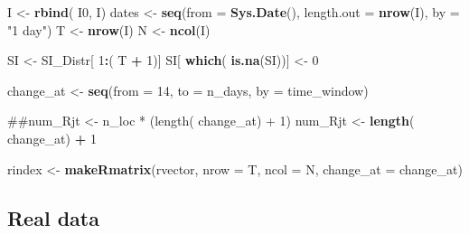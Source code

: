 \documentclass[11pt,]{article}
\newenvironment{Shaded}{\begin{snugshade}}{\end{snugshade}}
\newcommand{\KeywordTok}[1]{\textcolor[rgb]{0.13,0.29,0.53}{\textbf{#1}}}
\newcommand{\DataTypeTok}[1]{\textcolor[rgb]{0.13,0.29,0.53}{#1}}
\newcommand{\DecValTok}[1]{\textcolor[rgb]{0.00,0.00,0.81}{#1}}
\newcommand{\StringTok}[1]{\textcolor[rgb]{0.31,0.60,0.02}{#1}}
\newcommand{\OperatorTok}[1]{\textcolor[rgb]{0.81,0.36,0.00}{\textbf{#1}}}
\newcommand{\NormalTok}[1]{#1}
\begin{document}
\begin{Shaded}
\begin{Highlighting}[]
\NormalTok{I     <-}\StringTok{ }\KeywordTok{rbind}\NormalTok{( I0, I)}
\NormalTok{dates <-}\StringTok{ }\KeywordTok{seq}\NormalTok{(}\DataTypeTok{from =} \KeywordTok{Sys.Date}\NormalTok{(),}
             \DataTypeTok{length.out =} \KeywordTok{nrow}\NormalTok{(I),}
             \DataTypeTok{by =} \StringTok{"1 day"}\NormalTok{)}
\NormalTok{T  <-}\StringTok{ }\KeywordTok{nrow}\NormalTok{(I)}
\NormalTok{N  <-}\StringTok{ }\KeywordTok{ncol}\NormalTok{(I)}

\NormalTok{SI <-}\StringTok{ }\NormalTok{SI_Distr[ }\DecValTok{1}\OperatorTok{:}\NormalTok{( T }\OperatorTok{+}\StringTok{ }\DecValTok{1}\NormalTok{)]}
\NormalTok{SI[ }\KeywordTok{which}\NormalTok{( }\KeywordTok{is.na}\NormalTok{(SI))] <-}\StringTok{ }\DecValTok{0}

\NormalTok{change_at <-}\StringTok{ }\KeywordTok{seq}\NormalTok{(}\DataTypeTok{from =} \DecValTok{14}\NormalTok{, }\DataTypeTok{to =}\NormalTok{ n_days, }\DataTypeTok{by =}\NormalTok{ time_window)}

\NormalTok{##num_Rjt   <-  n_loc * (length( change_at) + 1)}
\NormalTok{num_Rjt <-}\StringTok{ }\KeywordTok{length}\NormalTok{( change_at) }\OperatorTok{+}\StringTok{ }\DecValTok{1}

\NormalTok{rindex  <-}\StringTok{ }\KeywordTok{makeRmatrix}\NormalTok{(rvector, }\DataTypeTok{nrow =}\NormalTok{ T, }\DataTypeTok{ncol =}\NormalTok{ N,}
                         \DataTypeTok{change_at =}\NormalTok{ change_at)}
\end{Highlighting}
\end{Shaded}

\subsection{Real data}\label{real-data}

\begin{Shaded}
\end{Shaded}
\end{document}
